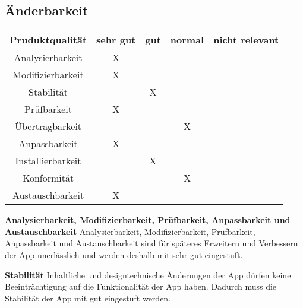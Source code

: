 \documentclass[parskip=full]{scrartcl}
\begin{document}
\subsection{Änderbarkeit}
\begin{tabular}{| c | c | c | c | c |}
    \hline
    \textbf{Pruduktqualität} & \textbf{sehr gut} & \textbf{gut} & \textbf{normal} & \textbf{nicht relevant} \\ \hline
    Analysierbarkeit         & X                 &              &                 &                         \\ \hline
    Modifizierbarkeit        & X                 &              &                 &                         \\ \hline
    Stabilität               &                   & X            &                 &                         \\ \hline
    Prüfbarkeit              & X                 &              &                 &                         \\ \hline
    Übertragbarkeit          &                   &              & X               &                         \\ \hline
    Anpassbarkeit            & X                 &              &                 &                         \\ \hline
    Installierbarkeit        &                   & X            &                 &                         \\ \hline
    Konformität              &                   &              & X               &                         \\ \hline
    Austauschbarkeit         & X                 &              &                 &                         \\ \hline
\end{tabular}

\textbf{Analysierbarkeit, Modifizierbarkeit, Prüfbarkeit, Anpassbarkeit und Austauschbarkeit} \newline
Analysierbarkeit, Modifizierbarkeit, Prüfbarkeit, Anpassbarkeit und Austauschbarkeit sind für späteres Erweitern und Verbessern der App unerlässlich und werden deshalb mit sehr gut eingestuft.

\textbf{Stabilität}\newline
Inhaltliche und designtechnische Änderungen der App dürfen keine Beeinträchtigung auf die Funktionalität der App haben.
Dadurch muss die Stabilität der App mit gut eingestuft werden.
\end{document}
